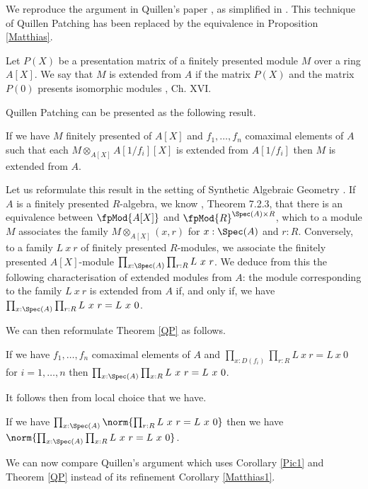 We reproduce the argument in Quillen's paper \cite{Quillen}, as simplified in \cite{lombardi-quitte}.
This technique of Quillen Patching has been replaced by the equivalence in Proposition \ref{Matthias}.

Let $P(X)$ be a presentation matrix of a finitely presented module $M$ over a ring $A[X]$. We say that $M$
is extended from $A$ if the matrix $P(X)$ and the matrix $P(0)$ presents isomorphic modules \cite{lombardi-quitte}, Ch. XVI.

 Quillen Patching can be presented as the following result.

\begin{theorem}\label{QP}
  If we have $M$ finitely presented of $A[X]$ and $f_1,\dots,f_n$ comaximal elements of $A$
  such that each $M\otimes_{A[X]} A[1/f_i][X]$ is extended from $A[1/f_i]$ then $M$ is extended from $A$.
\end{theorem}

Let us reformulate this result in the setting of Synthetic Algebraic Geometry \cite{draft}.
If $A$ is a finitely presented $R$-algebra, we know \cite{draft}, Theorem 7.2.3, that there is an
equivalence between $\fpMod{A[X]}$ and ${\fpMod{R}}^{\Spec(A)\times R}$, which to a module $M$
associates the family $M\otimes_{A[X]} (x,r)$ for $x:\Spec(A)$ and $r:R$. Conversely, to a family $L~x~r$
of finitely presented $R$-modules, we associate the finitely presented $A[X]$-module $\prod_{x:\Spec(A)}\prod_{r:R}L~x~r$.
We deduce from this the following characterisation of extended modules from $A$: the module corresponding to the
family $L~x~r$ is extended from $A$ if, and only if, we have $\prod_{x:\Spec(A)}\prod_{r:R}L~x~r = L~x~0$.

We can then reformulate Theorem \ref{QP} as follows.

\begin{corollary}
  If we have $f_1,\dots,f_n$ comaximal elements of $A$ and $\prod_{x:D(f_i)}\prod_{r:R}L~x~r = L~x~0$ for $i=1,\dots, n$
  then $\prod_{x:\Spec(A)}\prod_{x:R}L~x~r = L~x~0$.
\end{corollary}

It follows then from local choice that we have.

\begin{corollary}\label{QP1}
  If we have $\prod_{x:\Spec(A)}\norm{\prod_{r:R}L~x~r = L~x~0}$ then we have $\norm{\prod_{x:\Spec(A)}\prod_{x:R}L~x~r = L~x~0}$.
\end{corollary}

We can now compare Quillen's argument which uses Corollary \ref{Pic1} and Theorem \ref{QP}
instead of its refinement Corollary \ref{Matthias1}.

